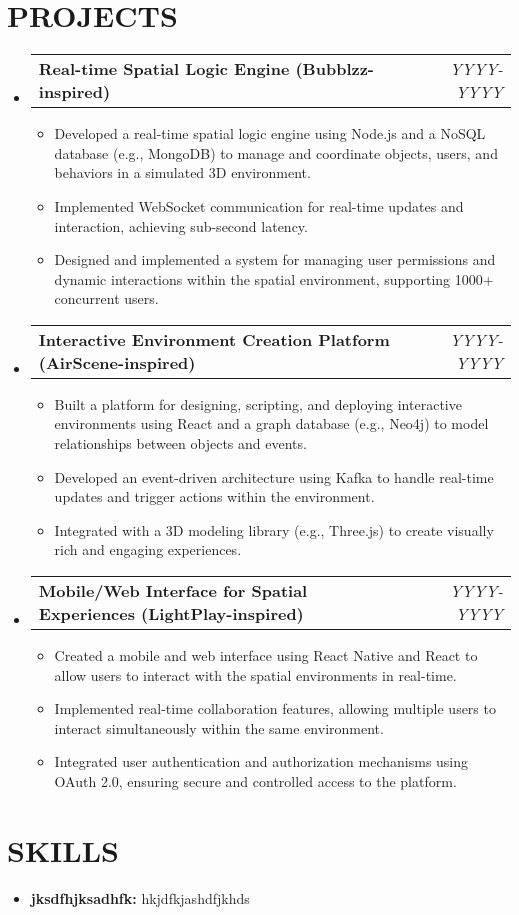 \documentclass[letterpaper,11pt]{article}
\makeatletter
\newcommand{\resumeItem}[1]{\item\small{{#1 \vspace{-3pt}}}}
\newcommand{\resumeProjectHeading}[2]{\item\begin{tabular*}{0.97\textwidth}{l@{\extracolsep{\fill}}r}\small#1 & #2 \\\end{tabular*}\vspace{-7pt}}
\newcommand{\resumeSubHeadingListStart}{\begin{itemize}[leftmargin=0.15in, label={}]}
\newcommand{\resumeSubHeadingListEnd}{\end{itemize}}
\newcommand{\resumeItemListStart}{\begin{itemize}}
\newcommand{\resumeItemListEnd}{\end{itemize}\vspace{-5pt}}
\makeatother
\begin{document}
\section{{\fontsize{9pt}{20pt}\selectfont \textbf{PROJECTS}}}\resumeSubHeadingListStart
\resumeProjectHeading{\textbf{Real-time Spatial Logic Engine (Bubblzz-inspired)}}{\textit{YYYY-YYYY}}
\resumeItemListStart
\resumeItem{Developed a real-time spatial logic engine using Node.js and a NoSQL database (e.g., MongoDB) to manage and coordinate objects, users, and behaviors in a simulated 3D environment.}
\resumeItem{Implemented WebSocket communication for real-time updates and interaction, achieving sub-second latency.}
\resumeItem{Designed and implemented a system for managing user permissions and dynamic interactions within the spatial environment, supporting 1000+ concurrent users.}
\resumeItemListEnd\vspace{-6pt}
\resumeProjectHeading{\textbf{Interactive Environment Creation Platform (AirScene-inspired)}}{\textit{YYYY-YYYY}}
\resumeItemListStart
\resumeItem{Built a platform for designing, scripting, and deploying interactive environments using React and a graph database (e.g., Neo4j) to model relationships between objects and events.}
\resumeItem{Developed an event-driven architecture using Kafka to handle real-time updates and trigger actions within the environment.}
\resumeItem{Integrated with a 3D modeling library (e.g., Three.js) to create visually rich and engaging experiences.}
\resumeItemListEnd\vspace{-6pt}
\resumeProjectHeading{\textbf{Mobile/Web Interface for Spatial Experiences (LightPlay-inspired)}}{\textit{YYYY-YYYY}}
\resumeItemListStart
\resumeItem{Created a mobile and web interface using React Native and React to allow users to interact with the spatial environments in real-time.}
\resumeItem{Implemented real-time collaboration features, allowing multiple users to interact simultaneously within the same environment.}
\resumeItem{Integrated user authentication and authorization mechanisms using OAuth 2.0, ensuring secure and controlled access to the platform.}
\resumeItemListEnd
\resumeSubHeadingListEnd\vspace{-17pt}
\section{{\fontsize{9pt}{20pt}\selectfont \textbf{SKILLS}}}\resumeSubHeadingListStart
\resumeItem{\textbf{jksdfhjksadhfk:} hkjdfkjashdfjkhds}
\resumeSubHeadingListEnd\vspace{-10pt}
\end{document}
